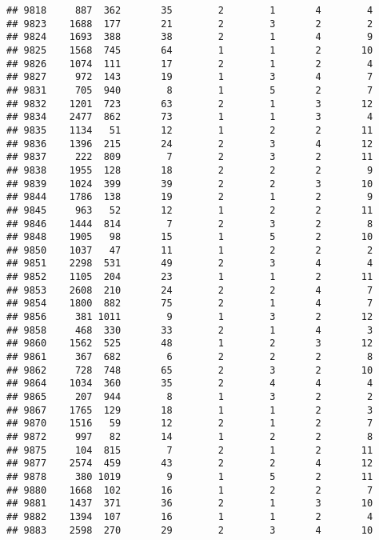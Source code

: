 \documentclass[]{article}
\begin{document}
\begin{verbatim}
## 9818     887  362       35        2        1       4        4
## 9823    1688  177       21        2        3       2        2
## 9824    1693  388       38        2        1       4        9
## 9825    1568  745       64        1        1       2       10
## 9826    1074  111       17        2        1       2        4
## 9827     972  143       19        1        3       4        7
## 9831     705  940        8        1        5       2        7
## 9832    1201  723       63        2        1       3       12
## 9834    2477  862       73        1        1       3        4
## 9835    1134   51       12        1        2       2       11
## 9836    1396  215       24        2        3       4       12
## 9837     222  809        7        2        3       2       11
## 9838    1955  128       18        2        2       2        9
## 9839    1024  399       39        2        2       3       10
## 9844    1786  138       19        2        1       2        9
## 9845     963   52       12        1        2       2       11
## 9846    1444  814        7        2        3       2        8
## 9848    1905   98       15        1        5       2       10
## 9850    1037   47       11        1        2       2        2
## 9851    2298  531       49        2        3       4        4
## 9852    1105  204       23        1        1       2       11
## 9853    2608  210       24        2        2       4        7
## 9854    1800  882       75        2        1       4        7
## 9856     381 1011        9        1        3       2       12
## 9858     468  330       33        2        1       4        3
## 9860    1562  525       48        1        2       3       12
## 9861     367  682        6        2        2       2        8
## 9862     728  748       65        2        3       2       10
## 9864    1034  360       35        2        4       4        4
## 9865     207  944        8        1        3       2        2
## 9867    1765  129       18        1        1       2        3
## 9870    1516   59       12        2        1       2        7
## 9872     997   82       14        1        2       2        8
## 9875     104  815        7        2        1       2       11
## 9877    2574  459       43        2        2       4       12
## 9878     380 1019        9        1        5       2       11
## 9880    1668  102       16        1        2       2        7
## 9881    1437  371       36        2        1       3       10
## 9882    1394  107       16        1        1       2        4
## 9883    2598  270       29        2        3       4       10

\end{verbatim}
\end{document}
